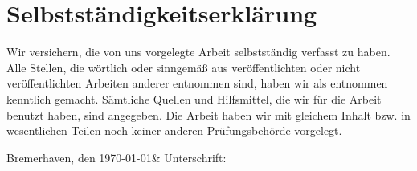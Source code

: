 \section*{Selbstständigkeitserklärung}

Wir versichern, die von uns vorgelegte Arbeit selbstständig verfasst zu haben. Alle Stellen, die wörtlich oder sinngemäß aus veröffentlichten oder nicht veröffentlichten Arbeiten anderer entnommen sind, 
haben wir als entnommen kenntlich gemacht. Sämtliche Quellen und Hilfsmittel, die wir für die Arbeit benutzt haben, sind angegeben. Die Arbeit haben wir mit gleichem Inhalt bzw. in wesentlichen 
Teilen noch keiner anderen Prüfungsbehörde vorgelegt.


Bremerhaven, den \today & Unterschrift:\\
